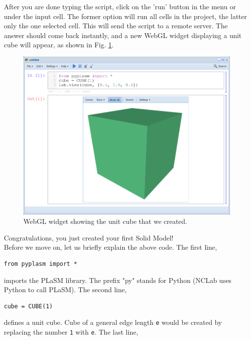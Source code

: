 \documentclass{article}
\begin{document}
After you are done typing the script, click on the 'run' button in the menu 
or under the input cell. The former option will run all cells 
in the project, the latter only the one selected cell. This will send the script to a remote
server. The answer should come back instantly, and a new WebGL widget displaying a unit cube 
will appear, as shown in Fig. \ref{fig:cube}. 

\begin{figure}[!ht]
\begin{center}
\includegraphics[width=\textwidth]{img/cube.png}
\end{center}
\vspace{-2mm}
\caption{WebGL widget showing the unit cube that we created.}
\vspace{2mm}
\label{fig:cube}
\end{figure}
\noindent
Congratulations, you just 
created your first Solid Model!\\

\noindent
Before we move on, let us briefly explain the above code.
The first line, 

\begin{verbatim}
from pyplasm import *
\end{verbatim}
imports the PLaSM library. The prefix "py" stands for Python (NCLab uses
Python to call PLaSM). The second line,

\begin{verbatim}
cube = CUBE(1)
\end{verbatim}
defines a unit cube. Cube of a general edge length {\tt e} would be 
created by replacing the number {\tt 1} with {\tt e}. The last line,
\end{document}
